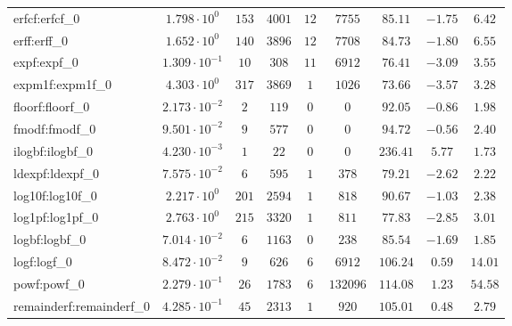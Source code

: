 \begin{tabular}{|l|c|c|c|c|c|c|c|c|}
erfcf:erfcf\_0               & $ 1.798 \cdot 10^{0}  $ & $ 153    $ & $ 4001  $ & $ 12  $ & $ 7755   $ & $ 85.11       $ & $ -1.75   $ & $ 6.42    $ \\
erff:erff\_0                 & $ 1.652 \cdot 10^{0}  $ & $ 140    $ & $ 3896  $ & $ 12  $ & $ 7708   $ & $ 84.73       $ & $ -1.80   $ & $ 6.55    $ \\
expf:expf\_0                 & $ 1.309 \cdot 10^{-1} $ & $ 10     $ & $ 308   $ & $ 11  $ & $ 6912   $ & $ 76.41       $ & $ -3.09   $ & $ 3.55    $ \\
expm1f:expm1f\_0             & $ 4.303 \cdot 10^{0}  $ & $ 317    $ & $ 3869  $ & $ 1   $ & $ 1026   $ & $ 73.66       $ & $ -3.57   $ & $ 3.28    $ \\
floorf:floorf\_0             & $ 2.173 \cdot 10^{-2} $ & $ 2      $ & $ 119   $ & $ 0   $ & $ 0      $ & $ 92.05       $ & $ -0.86   $ & $ 1.98    $ \\
fmodf:fmodf\_0               & $ 9.501 \cdot 10^{-2} $ & $ 9      $ & $ 577   $ & $ 0   $ & $ 0      $ & $ 94.72       $ & $ -0.56   $ & $ 2.40    $ \\
ilogbf:ilogbf\_0             & $ 4.230 \cdot 10^{-3} $ & $ 1      $ & $ 22    $ & $ 0   $ & $ 0      $ & $ 236.41      $ & $ 5.77    $ & $ 1.73    $ \\
ldexpf:ldexpf\_0             & $ 7.575 \cdot 10^{-2} $ & $ 6      $ & $ 595   $ & $ 1   $ & $ 378    $ & $ 79.21       $ & $ -2.62   $ & $ 2.22    $ \\
log10f:log10f\_0             & $ 2.217 \cdot 10^{0}  $ & $ 201    $ & $ 2594  $ & $ 1   $ & $ 818    $ & $ 90.67       $ & $ -1.03   $ & $ 2.38    $ \\
log1pf:log1pf\_0             & $ 2.763 \cdot 10^{0}  $ & $ 215    $ & $ 3320  $ & $ 1   $ & $ 811    $ & $ 77.83       $ & $ -2.85   $ & $ 3.01    $ \\
logbf:logbf\_0               & $ 7.014 \cdot 10^{-2} $ & $ 6      $ & $ 1163  $ & $ 0   $ & $ 238    $ & $ 85.54       $ & $ -1.69   $ & $ 1.85    $ \\
logf:logf\_0                 & $ 8.472 \cdot 10^{-2} $ & $ 9      $ & $ 626   $ & $ 6   $ & $ 6912   $ & $ 106.24      $ & $ 0.59    $ & $ 14.01   $ \\
powf:powf\_0                 & $ 2.279 \cdot 10^{-1} $ & $ 26     $ & $ 1783  $ & $ 6   $ & $ 132096 $ & $ 114.08      $ & $ 1.23    $ & $ 54.58   $ \\
remainderf:remainderf\_0     & $ 4.285 \cdot 10^{-1} $ & $ 45     $ & $ 2313  $ & $ 1   $ & $ 920    $ & $ 105.01      $ & $ 0.48    $ & $ 2.79    $ \\

\end{tabular}
